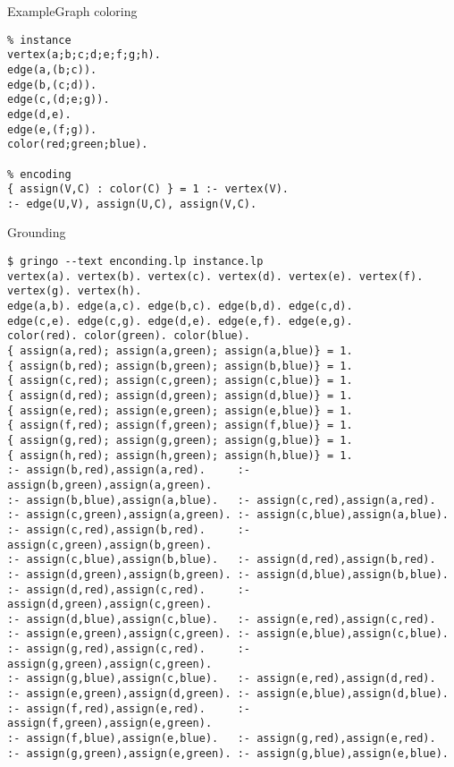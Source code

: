 \begin{frame}[fragile]{Example}{Graph coloring}
\begin{lstlisting}
% instance
vertex(a;b;c;d;e;f;g;h).
edge(a,(b;c)).
edge(b,(c;d)).
edge(c,(d;e;g)).
edge(d,e).
edge(e,(f;g)).
color(red;green;blue).

% encoding
{ assign(V,C) : color(C) } = 1 :- vertex(V).
:- edge(U,V), assign(U,C), assign(V,C).
\end{lstlisting}
\end{frame}
\begin{frame}[fragile]{Grounding}
\begin{adjustbox}{max totalsize={\textwidth}{.83\textheight},keepaspectratio}
\begin{lstlisting}
$ gringo --text enconding.lp instance.lp
vertex(a). vertex(b). vertex(c). vertex(d). vertex(e). vertex(f). vertex(g). vertex(h).
edge(a,b). edge(a,c). edge(b,c). edge(b,d). edge(c,d).
edge(c,e). edge(c,g). edge(d,e). edge(e,f). edge(e,g).
color(red). color(green). color(blue).
{ assign(a,red); assign(a,green); assign(a,blue)} = 1.
{ assign(b,red); assign(b,green); assign(b,blue)} = 1.
{ assign(c,red); assign(c,green); assign(c,blue)} = 1.
{ assign(d,red); assign(d,green); assign(d,blue)} = 1.
{ assign(e,red); assign(e,green); assign(e,blue)} = 1.
{ assign(f,red); assign(f,green); assign(f,blue)} = 1.
{ assign(g,red); assign(g,green); assign(g,blue)} = 1.
{ assign(h,red); assign(h,green); assign(h,blue)} = 1.
:- assign(b,red),assign(a,red).     :- assign(b,green),assign(a,green).
:- assign(b,blue),assign(a,blue).   :- assign(c,red),assign(a,red).
:- assign(c,green),assign(a,green). :- assign(c,blue),assign(a,blue).
:- assign(c,red),assign(b,red).     :- assign(c,green),assign(b,green).
:- assign(c,blue),assign(b,blue).   :- assign(d,red),assign(b,red).
:- assign(d,green),assign(b,green). :- assign(d,blue),assign(b,blue).
:- assign(d,red),assign(c,red).     :- assign(d,green),assign(c,green).
:- assign(d,blue),assign(c,blue).   :- assign(e,red),assign(c,red).
:- assign(e,green),assign(c,green). :- assign(e,blue),assign(c,blue).
:- assign(g,red),assign(c,red).     :- assign(g,green),assign(c,green).
:- assign(g,blue),assign(c,blue).   :- assign(e,red),assign(d,red).
:- assign(e,green),assign(d,green). :- assign(e,blue),assign(d,blue).
:- assign(f,red),assign(e,red).     :- assign(f,green),assign(e,green).
:- assign(f,blue),assign(e,blue).   :- assign(g,red),assign(e,red).
:- assign(g,green),assign(e,green). :- assign(g,blue),assign(e,blue).
\end{lstlisting}
\end{adjustbox}
\end{frame}
